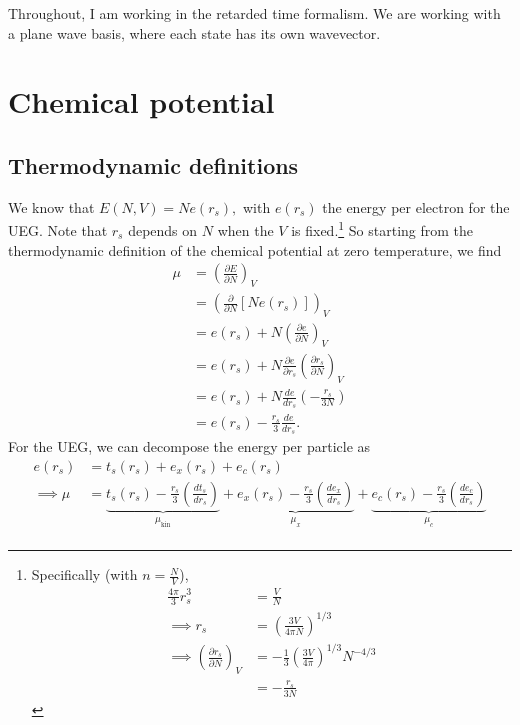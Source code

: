 Throughout, I am working in the retarded time formalism. We are working with a plane wave basis, where each state has its own wavevector.
\section{Chemical potential}
\subsection{Thermodynamic definitions}
We know that 
$    E(N,V)
    =
    N e(r_s),$
with $e(r_s)$ the energy per electron for the UEG. Note that $r_s$ depends on $N$ when
the $V$ is fixed.\footnote{Specifically (with $n=\frac{N}{V}$),
\begin{align}
    \frac{4\pi}{3}r_s^3
    &=
    \frac{V}{N}\\
\implies r_s &=
    \left(
    \frac{3V}{4\pi N}
    \right)^{1/3} \\
\implies \left(
    \frac{\partial r_s}{\partial N}
    \right)_V
    &=
    -\frac{1}{3}
    \left(
    \frac{3V}{4\pi}
    \right)^{1/3}
    N^{-4/3}\\
&=
    -\frac{r_s}{3N}
\end{align}}
So starting from the thermodynamic definition of the chemical potential at zero temperature, we find
\begin{align}
    \mu
    &=
    \left(
    \frac{\partial E}{\partial N}
    \right)_V \\
    &=
    \left(
    \frac{\partial}{\partial N}
    \left[
    N e(r_s)
    \right]
    \right)_V \\
    &=
    e(r_s)
    +
    N
    \left(
    \frac{\partial e}{\partial N}
    \right)_V\\
&= 
    e(r_s)
    +
    N
    \frac{\partial e}{\partial r_s}
    \left(
    \frac{\partial r_s}{\partial N}
    \right)_V\\
    &=
    e(r_s)
    +
    N
    \frac{de}{dr_s}
    \left(
    -\frac{r_s}{3N}
    \right)
    \\
    &=
    e(r_s)
    -
    \frac{r_s}{3}
    \frac{de}{dr_s}.
\end{align}
For the UEG, we can decompose the energy per
particle as
\begin{align}
    e(r_s)
    &=
    t_s(r_s)
    +
    e_x(r_s)
    +
    e_c(r_s)\\
\implies \mu &=
\underbrace{    t_s(r_s)
    -
    \frac{r_s}{3}
    \left(
    \frac{dt_s}{dr_s}
    \right)}_{\mu_{\mathrm{kin}}}
    +
    \underbrace{e_x(r_s) - \frac{r_s}{3}\left(\frac{de_x}{dr_s}\right)}_{\mu_x}
    +
    \underbrace{e_c(r_s) - \frac{r_s}{3}\left(\frac{de_c}{dr_s}\right)}_{\mu_c}\\
\end{align}
